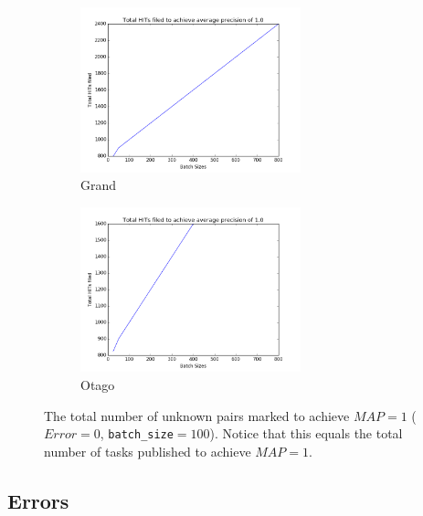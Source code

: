 \begin{figure}[htbp]
  \centering
  \begin{subfigure}[t]{\textwidth}
      \centering
      \includegraphics[width=0.7\textwidth]{sizes/grtotal}
      \caption{Grand}
  \end{subfigure}%

    \begin{subfigure}[t]{\textwidth}
      \centering
      \includegraphics[width=0.7\textwidth]{sizes/ottotal}
      \caption{Otago}
  \end{subfigure}%
  \captionsetup{justification=centering}
  \caption{The total number of unknown pairs marked to achieve $MAP=1$
  ($Error=0$, \texttt{batch\_size}$=100$). Notice that this equals the total
  number of tasks published to achieve $MAP=1$. }
  \label{fig:sizes_curves} %
\end{figure}


\subsection{Errors} %
\label{sub:results_errors}

